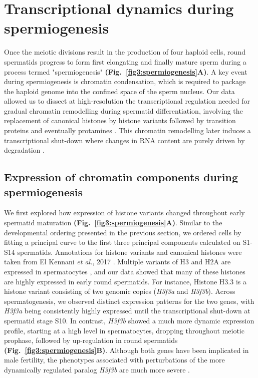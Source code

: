 \section{Transcriptional dynamics during spermiogenesis}
\label{sec3:spermiogenesis}

Once the meiotic divisions result in the production of four haploid cells, round spermatids progress to form first elongating and finally mature sperm during a process termed "spermiogenesis" \textbf{(Fig.~\ref{fig3:spermiogenesis}A)}. A key event during spermiogenesis is chromatin condensation, which is required to package the haploid genome into the confined space of the sperm nucleus. Our data allowed us to dissect at high-resolution the transcriptional regulation needed for gradual chromatin remodelling during spermatid differentiation, involving the replacement of canonical histones by histone variants followed by transition proteins and eventually protamines \citep{Balhorn2007, Kennani2017}. This chromatin remodelling later induces a transcriptional shut-down where changes in RNA content are purely driven by degradation \citep{Steger1999}.

\subsection{Expression of chromatin components during spermiogenesis}

We first explored how expression of histone variants changed throughout early spermatid maturation \textbf{(Fig.~\ref{fig3:spermiogenesis}A)}. Similar to the developmental ordering presented in the previous section, we ordered cells by fitting a principal curve to the first three principal components calculated on S1-S14 spermatids. Annotations for histone variants and canonical histones were taken from El Kennani \emph{et al.}, 2017 \citep{Kennani2017}. Multiple variants of H3 and H2A are expressed in spermatocytes \citep{Greaves2006, Mahadevaiah2001, Tang2015}, and our data showed that many of these histones are highly expressed in early round spermatids. For instance, Histone H3.3 is a histone variant consisting of two genomic copies (\textit{H3f3a} and \textit{H3f3b}). Across spermatogenesis, we observed distinct expression patterns for the two genes, with \textit{H3f3a} being consistently highly expressed until the transcriptional shut-down at spermatid stage S10. In contrast, \textit{H3f3b} showed a much more dynamic expression profile, starting at a high level in spermatocytes, dropping throughout meiotic prophase, followed by up-regulation in round spermatids \textbf{(Fig.~\ref{fig3:spermiogenesis}B)}. Although both genes have been implicated in male fertility, the phenotypes associated with perturbations of the more dynamically regulated paralog \textit{H3f3b} are much more severe \citep{Tang2015, Yuen2014}.\\

